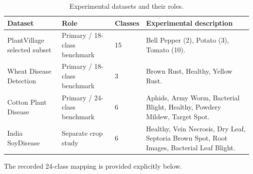 \documentclass[a4paper,fleqn]{cas-dc}
\begin{document}
\begin{table}[!t]
\centering
\caption{Experimental datasets and their roles.}
\label{tab:datasets}
\begin{tabular}{p{3.1cm}p{3.4cm}p{1.2cm}p{5.8cm}}
\toprule
Dataset & Role & Classes & Experimental description \\
\midrule
PlantVillage selected subset & Primary / 18-class benchmark & 15 & Bell Pepper (2), Potato (3), Tomato (10). \\
Wheat Disease Detection & Primary / 18-class benchmark & 3 & Brown Rust, Healthy, Yellow Rust. \\
Cotton Plant Disease & Primary / 24-class benchmark & 6 & Aphids, Army Worm, Bacterial Blight, Healthy, Powdery Mildew, Target Spot. \\
India SoyDisease & Separate crop study & 6 & Healthy, Vein Necrosis, Dry Leaf, Septoria Brown Spot, Root Images, Bacterial Leaf Blight. \\
\bottomrule
\end{tabular}
\end{table}

The recorded 24-class mapping is provided explicitly below.
\end{document}
